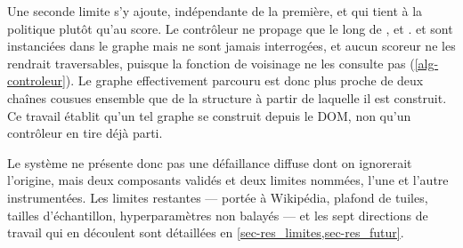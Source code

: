 Une seconde limite s'y ajoute, indépendante de la première, et qui tient à la
politique plutôt qu'au score. Le contrôleur ne propage que le long de
,  et .
 et  sont instanciées dans le
graphe mais ne sont jamais interrogées, et aucun scoreur ne les rendrait
traversables, puisque la fonction de voisinage ne les consulte pas
(\cref{alg-controleur}). Le graphe effectivement parcouru est donc plus proche
de deux chaînes cousues ensemble que de la structure à partir de laquelle il
est construit. Ce travail établit qu'un tel graphe se construit depuis le DOM,
non qu'un contrôleur en tire déjà parti.

Le système ne présente donc pas une défaillance diffuse dont on ignorerait
l'origine, mais deux composants validés et deux limites nommées, l'une et
l'autre instrumentées. Les limites restantes --- portée à Wikipédia,
plafond de tuiles, tailles d'échantillon, hyperparamètres non balayés --- et
les sept directions de travail qui en découlent sont détaillées en
\cref{sec-res_limites,sec-res_futur}.